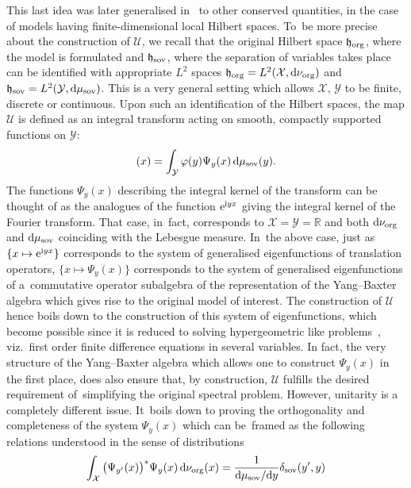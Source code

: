 \documentclass[pdftex]{sigma}%
\numberwithin{equation}{section}
\begin{document}
This last idea was later generalised in~\cite{MailletNiccoliNewQSoVIntoruction} to other conserved quantities, in the case of models having finite-dimensional local Hilbert
spaces. To~be more precise about the construction of $\mathcal{U}$, we recall that the original Hilbert space $\mathfrak{h}_{\rm org}$,
where the model is formulated and $\mathfrak{h}_{\rm sov}$, where the separation of variables takes place can be identified with
appropriate $L^2$ spaces $\mathfrak{h}_{\rm org} =L^2( \mathcal{X}, {\rm d}\nu_{\rm org})$ and
$\mathfrak{h}_{\rm sov}=L^2(\mathcal{Y}, {\rm d}\mu_{\rm sov})$. This is a very general setting which allows $\mathcal{X}$, $\mathcal{Y}$
to be finite, discrete or continuous. Upon such an identification of the Hilbert spaces, the map $\mathcal{U}$ is defined as an integral
transform acting on smooth, compactly supported functions on $\mathcal{Y}$:
\begin{gather*}
[\mathcal{U} \varphi](x) = \int_{ \mathcal{Y} }{} \varphi(y) \Psi_{y}(x) \, {\rm d}\mu_{\rm sov}(y) .
\end{gather*}
The functions $\Psi_{y}(x)$ describing the integral kernel of the transform can be thought of as the analogues of the function
${\rm e}^{{\rm i} y x}$ giving the integral kernel of the Fourier transform. That case, in~fact, corresponds to
$\mathcal{X}=\mathcal{Y}=\mathbb{R}$ and both ${\rm d}\nu_{\rm org}$ and ${\rm d}\mu_{\rm sov}$ coinciding with the Lebesgue measure. In~the
above case, just as $\{ x \mapsto {\rm e}^{{\rm i} y x} \}$ corresponds to the system of generalised eigenfunctions of translation operators, $
\{x \mapsto \Psi_{y}(x)\}$ corresponds to the system of generalised eigenfunctions of a~commutative operator subalgebra of the
representation of the Yang--Baxter algebra which gives rise to the original model of interest. The construction of $\mathcal{U}$ hence boils
down to the construction of this system of eigenfunctions, which become possible since it is reduced to solving hypergeometric like
problems~\cite{MR1239668}, viz.~first order finite difference equations in several variables. In fact, the very structure of the
Yang--Baxter algebra which allows one to construct $ \Psi_{y}(x)$ in the first place, does also ensure that, by construction, $\mathcal{U}$
fulfills the desired requirement of~simplifying the original spectral problem. However, unitarity is a completely different issue. It~boils
down to proving the orthogonality and completeness of the system $\Psi_{y}(x)$ which can be~framed as the following relations understood
in the sense of distributions
\begin{gather}
\int_{ \mathcal{X} } \big( \Psi_{{y}'}(x) \big)^* \Psi_{y}(x) \,{\rm d}\nu_{\rm org}(x) = \frac{1}{{\rm d}\mu_{\rm sov}/ {\rm d}y}\delta_{\rm sov}({y}',y)
\label{ecriture orthogonalite}
\end{gather}
\end{document}
